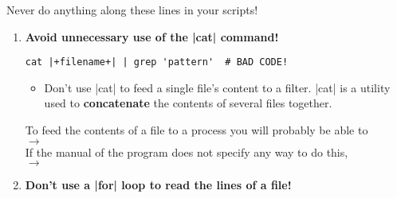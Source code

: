 \begin{frame}[fragile]{Never do anything along these lines in your scripts!}
\begin{enumerate}
\begin{lstlisting}[style=MyBash, numbers=none, aboveskip=3mm, belowskip=-6mm, xrightmargin=15mm]
                ls *.txt | grep 'story'            # ALSO BAD CODE!
            \end{lstlisting}
            \begin{itemize}
                \item Unless your \bash|grep| pattern is really smart it will probably not be trustworthy
                \item In the first example above, the test would match both \texttt{story.txt} \textbf{and} \texttt{story.txt.exe}!
                \item If you make \bash|grep| patterns that are smart enough, they'll probably be so ugly, massive and unreadable that you shouldn't use them anyway!
            \end{itemize}
            \\
            Bash has a feature called \textbf{Filename Expansion}.
            This will help you enumerate all files that match a certain pattern.
            Also, you can use globs to test whether a filename matches a certain glob pattern.
        \item<only@3>
            \alert{\large\textbf{Avoid unnecessary use of the \bash|cat| command!}}
            \begin{lstlisting}[style=MyBash, numbers=none, aboveskip=3mm, belowskip=-6mm, xrightmargin=35mm]
                cat |+filename+| | grep 'pattern'  # BAD CODE!
            \end{lstlisting}
            \begin{itemize}
                \item Don't use \bash|cat| to feed a single file's content to a filter.
                      \bash|cat| is a utility used to \textbf{concatenate} the contents of several files together.
            \end{itemize}
            To feed the contents of a file to a process you will probably be able to\\ $\to\;$\\
            If the manual of the program does not specify any way to do this,\\ $\to\;$
        \item<only@3>
            \alert{\large\textbf{Don't use a \bash|for| loop to read the lines of a file!}}
            \begin{lstlisting}[style=MyBash, numbers=none, aboveskip=3mm, belowskip=-6mm, xrightmargin=35mm]

\end{lstlisting}
\end{enumerate}
\end{frame}

